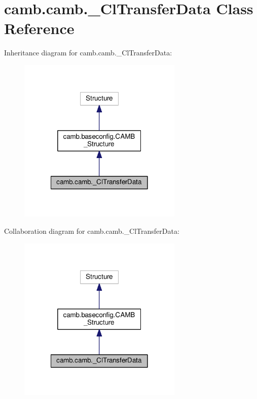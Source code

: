 \hypertarget{classcamb_1_1camb_1_1__ClTransferData}{}\section{camb.\+camb.\+\_\+\+Cl\+Transfer\+Data Class Reference}
\label{classcamb_1_1camb_1_1__ClTransferData}


Inheritance diagram for camb.\+camb.\+\_\+\+Cl\+Transfer\+Data\+:
\nopagebreak
\begin{figure}[H]
\begin{center}
\leavevmode
\includegraphics[width=222pt]{classcamb_1_1camb_1_1__ClTransferData__inherit__graph}
\end{center}
\end{figure}


Collaboration diagram for camb.\+camb.\+\_\+\+Cl\+Transfer\+Data\+:
\nopagebreak
\begin{figure}[H]
\begin{center}
\leavevmode
\includegraphics[width=222pt]{classcamb_1_1camb_1_1__ClTransferData__coll__graph}
\end{center}
\end{figure}
